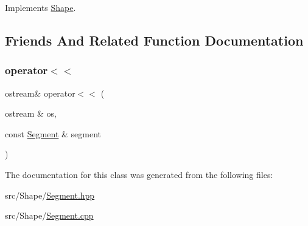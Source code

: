 Implements \hyperlink{class_shape_ad3daca0d9bedf9aa15b92afab63c1de8}{Shape}.



\subsection{Friends And Related Function Documentation}
\hypertarget{class_segment_a8071236184a6b1617c06f5e5742f25a7}{}\label{class_segment_a8071236184a6b1617c06f5e5742f25a7} 
\subsubsection{\texorpdfstring{operator$<$$<$}{operator<<}}
{\footnotesize\ttfamily ostream\& operator$<$$<$ (\begin{DoxyParamCaption}\item[{ostream \&}]{os,  }\item[{const \hyperlink{class_segment}{Segment} \&}]{segment }\end{DoxyParamCaption})\hspace{0.3cm}{\ttfamily [friend]}}



The documentation for this class was generated from the following files\+:\begin{DoxyCompactItemize}
\item 
src/\+Shape/\hyperlink{_segment_8hpp}{Segment.\+hpp}\item 
src/\+Shape/\hyperlink{_segment_8cpp}{Segment.\+cpp}\end{DoxyCompactItemize}

